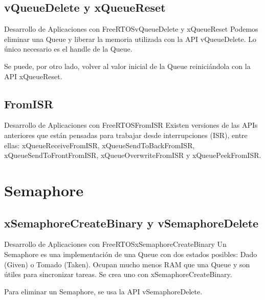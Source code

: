 \documentclass[aspectratio=169, xcolor=dvipsnames]{beamer}
\begin{document}
\subsection{vQueueDelete y xQueueReset}
\begin{frame}{Desarrollo de Aplicaciones con FreeRTOS}{vQueueDelete y xQueueReset}
Podemos eliminar una Queue y liberar la memoria utilizada con la API \textcolor{myblue}{vQueueDelete}. Lo único necesario es el handle de la Queue.\newline

Se puede, por otro lado, volver al valor inicial de la Queue reiniciándola con la API \textcolor{myblue}{xQueueReset}.\newline

\end{frame}

\subsection{FromISR}
\begin{frame}{Desarrollo de Aplicaciones con FreeRTOS}{FromISR}
Existen versiones de las APIs anteriores que están pensadas para trabajar desde interrupciones (ISR), entre ellas: \textcolor{myblue}{xQueueReceiveFromISR}, \textcolor{myblue}{xQueueSendToBackFromISR}, \textcolor{myblue}{xQueueSendToFrontFromISR}, \textcolor{myblue}{xQueueOverwriteFromISR} y \textcolor{myblue}{xQueuePeekFromISR}.\newline

\end{frame}

\section{Semaphore}
\subsection{xSemaphoreCreateBinary y vSemaphoreDelete}
\begin{frame}{Desarrollo de Aplicaciones con FreeRTOS}{xSemaphoreCreateBinary}
Un Semaphore es una implementación de una Queue con dos estados posibles: Dado (Given) o Tomado (Taken).\newline
Ocupan mucho menos RAM que una Queue y son útiles para sincronizar tareas. Se crea uno con \textcolor{myblue}{xSemaphoreCreateBinary}.\newline

Para eliminar un Semaphore, se usa la API \textcolor{myblue}{vSemaphoreDelete}.\newline

\end{frame}
\end{document}

